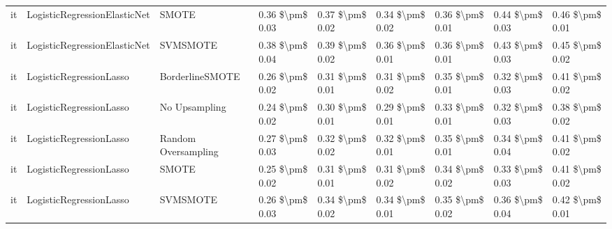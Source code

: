 \begin{tabular}{lllllllll}
      it &    LogisticRegressionElasticNet &                         SMOTE &     0.36 \$\textbackslash pm\$ 0.03 &           0.37 \$\textbackslash pm\$ 0.02 &       0.34 \$\textbackslash pm\$ 0.02 &        0.36 \$\textbackslash pm\$ 0.01 &                         0.44 \$\textbackslash pm\$ 0.03 &     0.46 \$\textbackslash pm\$ 0.01 \\
      it &    LogisticRegressionElasticNet &                      SVMSMOTE &     0.38 \$\textbackslash pm\$ 0.04 &           0.39 \$\textbackslash pm\$ 0.02 &       0.36 \$\textbackslash pm\$ 0.01 &        0.36 \$\textbackslash pm\$ 0.01 &                         0.43 \$\textbackslash pm\$ 0.03 &     0.45 \$\textbackslash pm\$ 0.02 \\
      it &         LogisticRegressionLasso &               BorderlineSMOTE &     0.26 \$\textbackslash pm\$ 0.02 &           0.31 \$\textbackslash pm\$ 0.01 &       0.31 \$\textbackslash pm\$ 0.02 &        0.35 \$\textbackslash pm\$ 0.01 &                         0.32 \$\textbackslash pm\$ 0.03 &     0.41 \$\textbackslash pm\$ 0.02 \\
      it &         LogisticRegressionLasso &                 No Upsampling &     0.24 \$\textbackslash pm\$ 0.02 &           0.30 \$\textbackslash pm\$ 0.01 &       0.29 \$\textbackslash pm\$ 0.01 &        0.33 \$\textbackslash pm\$ 0.01 &                         0.32 \$\textbackslash pm\$ 0.03 &     0.38 \$\textbackslash pm\$ 0.02 \\
      it &         LogisticRegressionLasso &           Random Oversampling &     0.27 \$\textbackslash pm\$ 0.03 &           0.32 \$\textbackslash pm\$ 0.02 &       0.32 \$\textbackslash pm\$ 0.01 &        0.35 \$\textbackslash pm\$ 0.01 &                         0.34 \$\textbackslash pm\$ 0.04 &     0.41 \$\textbackslash pm\$ 0.02 \\
      it &         LogisticRegressionLasso &                         SMOTE &     0.25 \$\textbackslash pm\$ 0.02 &           0.31 \$\textbackslash pm\$ 0.01 &       0.31 \$\textbackslash pm\$ 0.02 &        0.34 \$\textbackslash pm\$ 0.02 &                         0.33 \$\textbackslash pm\$ 0.03 &     0.41 \$\textbackslash pm\$ 0.02 \\
      it &         LogisticRegressionLasso &                      SVMSMOTE &     0.26 \$\textbackslash pm\$ 0.03 &           0.34 \$\textbackslash pm\$ 0.02 &       0.34 \$\textbackslash pm\$ 0.01 &        0.35 \$\textbackslash pm\$ 0.02 &                         0.36 \$\textbackslash pm\$ 0.04 &     0.42 \$\textbackslash pm\$ 0.01 \\

\end{tabular}
